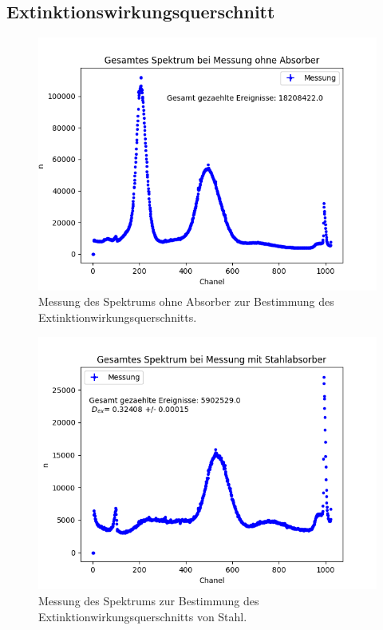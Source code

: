 \documentclass[12pt,a4paper]{article}
\begin{document}
\subsection{Extinktionswirkungsquerschnitt}
\begin{figure} [H]
\centering
\includegraphics[scale=0.8]{Bilder/Extinktion/OhneAbsorber.png}
\caption{Messung des Spektrums ohne Absorber zur Bestimmung des Extinktionwirkungsquerschnitts.}
\end{figure}

\begin{figure} [H]
\centering
\includegraphics[scale=0.8]{Bilder/Extinktion/Stahl.png}
\caption{Messung des Spektrums zur Bestimmung des Extinktionwirkungsquerschnitts von Stahl.}
\end{figure}
\end{document}
